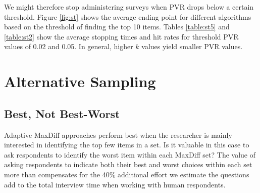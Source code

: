 \documentclass[nonblindrev]{informs3}
\begin{document}
We might therefore stop administering surveys when PVR drops below a certain threshold. Figure \ref{fig:st} shows the average ending point for different algorithms based on the threshold of finding the top 10 items. Tables \ref{table:st5} and \ref{table:st2} show the average stopping times and hit rates for threshold PVR values of 0.02 and 0.05. In general, higher $k$ values yield smaller PVR values.


\section{Alternative Sampling}


\subsection{Best, Not Best-Worst}

Adaptive MaxDiff approaches perform best when the researcher is mainly interested in identifying the top few items in a set. Is it valuable in this case to ask respondents to identify the worst item within each MaxDiff set? The value of asking respondents to indicate both their best and worst choices within each set more than compensates for the 40\% additional effort we estimate the questions add to the total interview time when working with human respondents.
\end{document}
